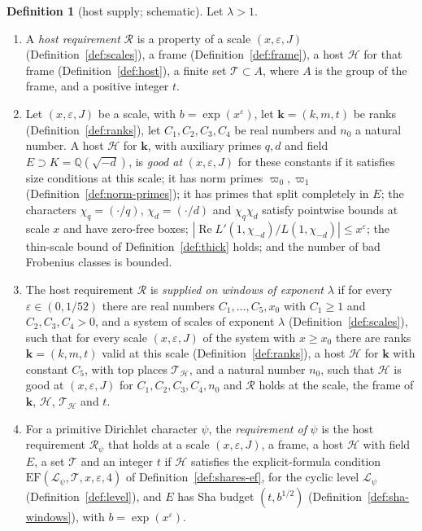\documentclass[11pt]{amsbook}
\theoremstyle{plain}
\theoremstyle{definition}
\newtheorem{definition}[theorem]{Definition}
\theoremstyle{remark}
\numberwithin{equation}{section}
\numberwithin{figure}{chapter}
\numberwithin{table}{chapter}
\newcommand{\Q}{\mathbb{Q}}
\newcommand{\eps}{\varepsilon}
\newcommand{\lev}{\mathscr{L}}
\newcommand{\Top}{\mathcal{T}}
\begin{document}
\begin{definition}[host supply; schematic]\label{def:host-supply}
Let $\lambda>1$.
\begin{enumerate}[label=(\arabic*)]
\item A \emph{host requirement} $\mathscr R$ is a property of a scale
$(x,\eps,J)$ (Definition~\ref{def:scales}), a frame
(Definition~\ref{def:frame}), a host $\mathcal H$ for that frame
(Definition~\ref{def:host}), a finite set $\Top\subset A$, where $A$
is the group of the frame, and a positive integer $t$.
\item\label{item:hs-good}
Let $(x,\eps,J)$ be a scale, with $b=\exp(x^\eps)$, let
$\mathbf k=(k,m,t)$ be ranks (Definition~\ref{def:ranks}), let
$C_1,C_2,C_3,C_4$ be real numbers and $n_0$ a natural number. A host
$\mathcal H$ for $\mathbf k$, with auxiliary primes $q,d$ and field
$E\supset K=\Q(\sqrt{-d})$, is \emph{good at} $(x,\eps,J)$ for these
constants if it satisfies size conditions at this scale; it has norm primes
$\varpi_0,\varpi_1$ (Definition~\ref{def:norm-primes}); it has primes
that split completely in $E$; the
characters $\chi_q=(\cdot/q)$, $\chi_d=(\cdot/d)$ and $\chi_q\chi_d$
satisfy pointwise
bounds at scale $x$ and have zero-free boxes;
$|\operatorname{Re}L'(1,\chi_{-d})/L(1,\chi_{-d})|\le x^\eps$; the
thin-scale bound of Definition~\ref{def:thick} holds; and the number
of bad Frobenius classes is bounded.
\item The host requirement $\mathscr R$ is \emph{supplied on windows of
exponent} $\lambda$
if for every $\eps\in(0,1/52)$ there are real numbers
$C_1,\dots,C_5,x_0$ with $C_1\ge1$ and $C_2,C_3,C_4>0$, and a
system of scales of exponent $\lambda$ (Definition~\ref{def:scales}),
such that for every scale $(x,\eps,J)$ of the system with $x\ge x_0$
there are ranks $\mathbf k=(k,m,t)$ valid at this scale
(Definition~\ref{def:ranks}), a host $\mathcal H$ for $\mathbf k$ with
constant $C_5$, with top places $\Top_{\mathcal H}$, and a natural
number $n_0$, such that $\mathcal H$ is good at $(x,\eps,J)$ for
$C_1,C_2,C_3,C_4,n_0$ and $\mathscr R$ holds at the scale, the frame
of $\mathbf k$, $\mathcal H$, $\Top_{\mathcal H}$ and $t$.
\item For a primitive Dirichlet character $\psi$, the
\emph{requirement of} $\psi$ is the host requirement $\mathscr R_\psi$
that holds at a scale $(x,\eps,J)$, a frame, a host $\mathcal H$ with
field $E$, a set $\Top$ and an integer $t$ if $\mathcal H$ satisfies
the explicit-formula condition $\mathrm{EF}(\lev_\psi,\Top,x,\eps,4)$
of Definition~\ref{def:shares-ef}, for the cyclic level $\lev_\psi$
(Definition~\ref{def:level}), and $E$ has Sha budget $(t,b^{1/2})$
(Definition~\ref{def:sha-windows}), with $b=\exp(x^\eps)$.
\end{enumerate}
\end{definition}
\end{document}

